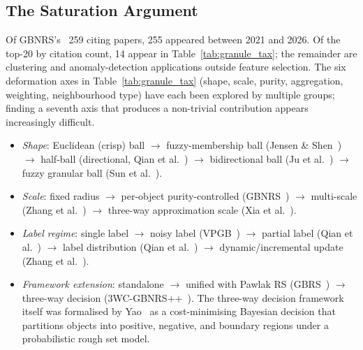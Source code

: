 \subsection{The Saturation Argument}
\label{sec:saturation}

Of GBNRS's~\cite{Xia2020GBNRS} 259 citing papers, 255 appeared between 2021
and 2026.  Of the top-20 by citation count, 14 appear in
Table~\ref{tab:granule_tax}; the remainder are clustering and anomaly-detection
applications outside feature selection.  The six deformation axes in Table~\ref{tab:granule_tax} (shape, scale,
purity, aggregation, weighting, neighbourhood type) have each been explored
by multiple groups; finding a seventh axis that produces a non-trivial
contribution appears increasingly difficult.

\begin{itemize}
  \item \emph{Shape}: Euclidean (crisp) ball $\to$ fuzzy-membership ball
        (Jensen \& Shen~\cite{JensenShen2007TFS}) $\to$ half-ball (directional,
        Qian et al.~\cite{Qian2024directional}) $\to$ bidirectional ball
        (Ju et al.~\cite{Ju2023bidirectional}) $\to$ fuzzy granular ball (Sun et
        al.~\cite{Sun2024TFS}).
  \item \emph{Scale}: fixed radius $\to$ per-object purity-controlled
        (GBNRS~\cite{Xia2020GBNRS}) $\to$ multi-scale (Zhang et
        al.~\cite{Zhang2025NN}) $\to$ three-way approximation scale
        (Xia et al.~\cite{XiaDeyou2024TFS}).
  \item \emph{Label regime}: single label $\to$ noisy label
        (VPGB~\cite{Peng2022VPGB}) $\to$ partial label
        (Qian et al.~\cite{Qian2023InfoFusion}) $\to$ label distribution
        (Qian et al.~\cite{Sun2023KBS}) $\to$ dynamic/incremental update
        (Zhang et al.~\cite{Zhang2023TKDEincremental}).
  \item \emph{Framework extension}: standalone $\to$ unified with Pawlak RS
        (GBRS~\cite{Xia2023GBRS}) $\to$ three-way decision
        (3WC-GBNRS++~\cite{Xia2024TFS3WC}).  The three-way decision framework
        itself was formalised by Yao~\cite{Yao2010threeway} as a cost-minimising
        Bayesian decision that partitions objects into positive, negative, and
        boundary regions under a probabilistic rough set model.
\end{itemize}

